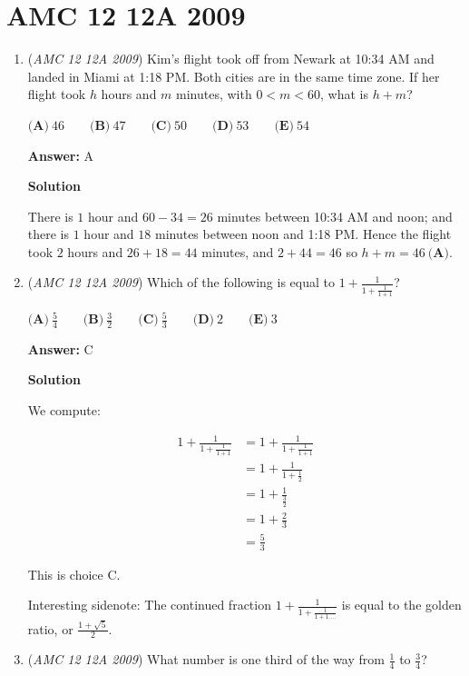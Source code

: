 \section{AMC 12 12A 2009}
        \begin{enumerate}
        	\item (\textit{AMC 12 12A 2009}) Kim's flight took off from Newark at 10:34 AM and landed in Miami at 1:18 PM. Both cities are in the same time zone. If her flight took $h$ hours and $m$ minutes, with $0 < m < 60$, what is $h + m$?


 $\textbf{(A)}\ 46 \qquad \textbf{(B)}\ 47 \qquad \textbf{(C)}\ 50 \qquad \textbf{(D)}\ 53 \qquad \textbf{(E)}\ 54$

 \textbf{Answer: }A



\textbf{Solution}

There is $1$ hour and $60-34 = 26$ minutes between 10:34 AM and noon; and there is $1$ hour and $18$ minutes between noon and 1:18 PM. Hence the flight took $2$ hours and $26 + 18 = 44$ minutes, and $2+44=46$ so $h+m= 46\ \textbf{(A)}$.

 


	\item (\textit{AMC 12 12A 2009}) Which of the following is equal to $1 + \frac {1}{1 + \frac {1}{1 + 1}}$?


 $\textbf{(A)}\ \frac {5}{4} \qquad \textbf{(B)}\ \frac {3}{2} \qquad \textbf{(C)}\ \frac {5}{3} \qquad \textbf{(D)}\ 2 \qquad \textbf{(E)}\ 3$

 \textbf{Answer: }C



\textbf{Solution}

We compute:

 
 \begin{align*} 1 + \frac {1}{1 + \frac {1}{1 + 1}} &= 1 + \frac {1}{1 + \frac {1}{1 + 1}} \\ &= 1 + \frac {1}{1 + \frac 12} \\ &= 1 + \frac {1}{\frac 32} \\ &= 1 + \frac 23 \\ &= \frac 53 \end{align*}


 This is choice $\boxed{\text{C}}$.

 Interesting sidenote: The continued fraction $1 + \frac {1}{1 + \frac {1}{1 + 1....}}$ is equal to the golden ratio, or $\frac{1+\sqrt{5}}{2}$.

 


	\item (\textit{AMC 12 12A 2009}) What number is one third of the way from $\frac14$ to $\frac34$?



\end{enumerate}
